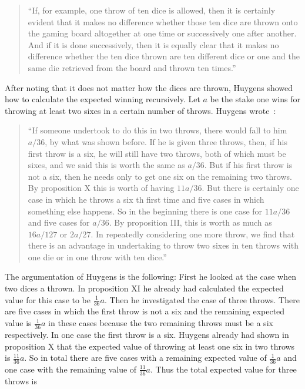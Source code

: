 \begin{quote}
  ``If, for example, one throw of ten dice is allowed, then it is certainly evident that it makes no difference whether those ten dice are thrown onto the gaming board altogether at one time or successively one after another. And if it is done successively, then it is equally clear that it makes no difference whether the ten dice thrown are ten different dice or one and the same die retrieved from the board and thrown ten times.''
\end{quote}

After noting that it does not matter how the dices are thrown, Huygens showed how to calculate the expected winning recursively. Let $a$ be the stake one wins for throwing at least two sixes in a certain number of throws. Huygens wrote~\cite[p. 163]{bernoulli}:

\begin{quote}
  ``If someone undertook to do this in two throws, there would fall to him $a/36$, by what was shown before. If he is given three throws, then, if his first throw is a six, he will still have two throws, both of which must be sixes, and we said this is worth the same as $a/36$. But if his first throw is not a six, then he needs only to get one six on the remaining two throws. By proposition X this is worth of having $11a/36$. But there is certainly one case in which he throws a six th first time and five cases in which something else happens. So in the beginning there is one case for $11a/36$ and five cases for $a/36$. By proposition III, this is worth as much as $16a/127$ or $2a/27$. In repeatedly considering one more throw, we find that there is an advantage in undertaking to throw two sixes in ten throws with one die or in one throw with ten dice.''
\end{quote}


The argumentation of Huygens is the following: First he looked at the case when two dices a thrown. In proposition XI he already had calculated the expected value for this case to be $\tfrac 1{36}a$. Then he investigated the case of three throws. There are five cases in which the first throw is not a six and the remaining expected value is $\tfrac 1{36}a$ in these cases because the two remaining throws must be a six respectively. In one case the first throw is a six. Huygens already had shown in proposition X that the expected value of throwing at least one six in two throws is $\tfrac{11}{36}a$. So in total there are five cases with a remaining expected value of $\tfrac 1{36}a$ and one case with the remaining value of $\tfrac{11}{36} a$. Thus the total expected value for three throws is

